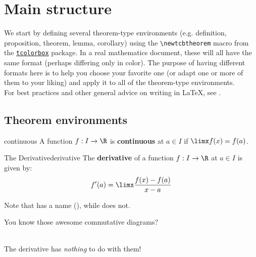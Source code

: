 \documentclass{article}
\begin{document}
\newpage

\section{Main structure}

We start by defining several theorem-type environments (e.g. definition, proposition, theorem, lemma, corollary) using the \verb!\newtcbtheorem! macro from the \href{https://ctan.org/pkg/tcolorbox}{\texttt{tcolorbox}} package. In a real mathematics document, these will all have the same format (perhaps differing only in color). The purpose of having different formats here is to help you choose your favorite one (or adapt one or more of them to your liking) and apply it to all of the theorem-type environments.\\

For best practices and other general advice on writing in \LaTeX, see \cite{evanchen,gleave}.

\subsection{Theorem environments}

\begin{definition}{}{continuous}
A function $f:I\to\R$ is \textbf{continuous} at $a\in I$ if $\limx f(x)=f(a)$.
\end{definition}

\begin{definition}{The Derivative}{derivative}
The \textbf{derivative} of a function $f:I\to\R$ at $a\in I$ is given by:
\begin{equation*}
    f'(a)=\limx\frac{f(x)-f(a)}{x-a}
\end{equation*}
\end{definition}

Note that  has a name (), while  does not.

\begin{center}
You know those awesome commutative diagrams?\\
\\
The derivative has \emph{nothing} to do with them!
\end{center}
\end{document}
